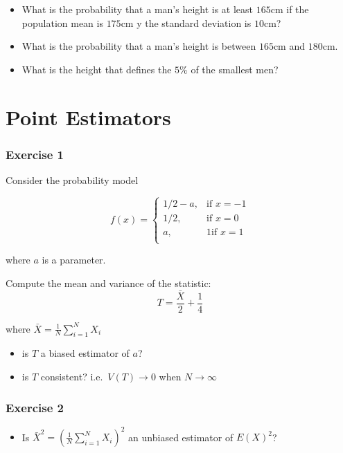 \documentclass[
]{book}
\providecommand{\tightlist}{%
  \setlength{\itemsep}{0pt}\setlength{\parskip}{0pt}}
\begin{document}
\begin{itemize}
\item
  What is the probability that a man's height is at least
  \(165\)cm if the population mean is \(175\)cm y the standard deviation is \(10\)cm?
\item
  What is the probability that a man's height is between
  \(165\)cm and \(180\)cm.
\item
  What is the height that defines the \(5\%\) of the smallest men?
\end{itemize}

\hypertarget{point-estimators}{%
\section{Point Estimators}\label{point-estimators}}

\hypertarget{exercise-1-5}{%
\subsubsection{Exercise 1}\label{exercise-1-5}}

Consider the probability model

\[
    f(x)= 
\begin{cases}
    1/2-a,& \text{if } x=-1 \\ 
    1/2,& \text{if } x=0\\
    a,& 1 \text{if } x=1\\ 
\end{cases}
\]

where \(a\) is a parameter.

Compute the mean and variance of the statistic: \[T=\frac{\bar{X}}{2}+\frac{1}{4}\]

where \(\bar{X}=\frac{1}{N}\sum_{i=1}^N X_i\)

\begin{itemize}
\item
  is \(T\) a biased estimator of \(a\)?
\item
  is \(T\) consistent? i.e.~\(V(T) \rightarrow 0\) when \(N\rightarrow \infty\)
\end{itemize}

\hypertarget{exercise-2-5}{%
\subsubsection{Exercise 2}\label{exercise-2-5}}

\begin{itemize}
\tightlist
\item
  Is \(\bar{X}^2=(\frac{1}{N}\sum_{i=1}^N X_i)^2\) an unbiased estimator of \(E(X)^2\)?
\end{itemize}
\end{document}
